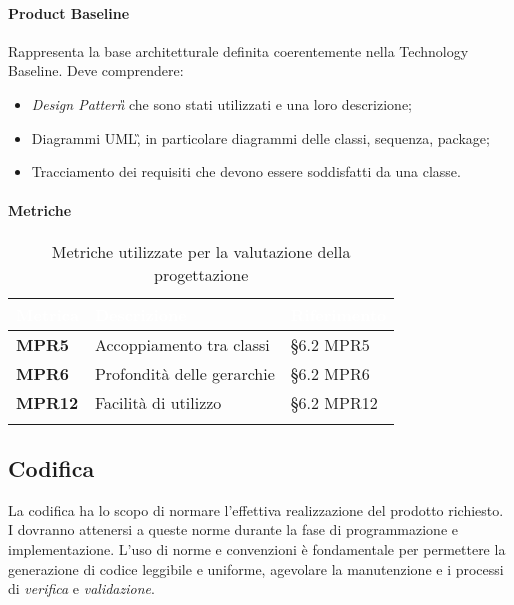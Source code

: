 \paragraph{Product Baseline} \aCapo{} 
Rappresenta la base architetturale definita coerentemente nella Technology Baseline. Deve comprendere:
\begin{itemize}
	\item {\textit{Design Pattern\G{}}} che sono stati utilizzati e una loro descrizione;
	\item Diagrammi UML\G, in particolare diagrammi delle classi, sequenza, package;
	\item Tracciamento dei requisiti che devono essere soddisfatti da una classe.
\end{itemize}

\paragraph{Metriche}
\setlength{\freewidth}{\dimexpr\textwidth-0\tabcolsep}
\renewcommand{\arraystretch}{1.5}
\setlength{\aboverulesep}{0pt}
\setlength{\belowrulesep}{0pt}
\begin{longtable}{L{.22\freewidth} L{.4\freewidth} L{.2\freewidth}}
	\toprule
	\textcolor{white}{\textbf{Metrica}}&
	\textcolor{white}{\textbf{Descrizione}}&	
	\textcolor{white}{\textbf{Riferimento}}\\	
	\toprule
	\endhead
	
	\textbf{MPR5} & Accoppiamento tra classi & \S 6.2 MPR5 \\
	\textbf{MPR6} & Profondità delle gerarchie & \S 6.2 MPR6 \\
	\textbf{MPR12} & Facilità di utilizzo & \S 6.2 MPR12 \\
	
	\bottomrule
	\caption*{Metriche utilizzate per la valutazione della progettazione}
\end{longtable}

\subsection{Codifica} %
La codifica ha lo scopo di normare l'effettiva realizzazione del prodotto richiesto. I \progrs{} dovranno attenersi a queste norme durante la fase di programmazione e implementazione.
L'uso di norme e convenzioni è fondamentale per permettere la generazione di codice leggibile e uniforme, agevolare la manutenzione e i processi di \emph{verifica} e \emph{validazione}.

